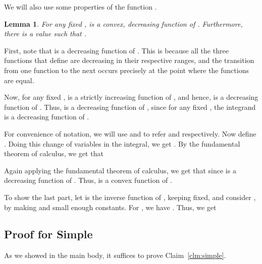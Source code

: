 \documentclass[11pt]{article}
\newtheorem{Lem}[theorem]{Lemma}
\newenvironment{myproof}{\noindent {\sc Proof:}}{}
\newcommand\Simple{{\sc Simple}\xspace}
\begin{document}
We will also use some properties of the function .

\begin{Lem} \label{lem:H-properties}
For any fixed ,  is a convex, decreasing function of
. Furthermore, there is a value  such that .
\end{Lem}
\begin{myproof}
First, note that  is a decreasing function of . This is
because all the three functions that define  are decreasing in their
respective ranges, and the transition from one function to the next occurs
precisely at the point where the functions are equal.

Now, for any fixed ,  is a strictly increasing
function of , and hence,  is a
decreasing function of . Thus,  is a decreasing function of , since
for any fixed , the integrand  is a
decreasing function of .

For convenience of notation, we will use  and  to refer  and  respectively. Now define .
Doing this change of variables in the integral, we get . By the fundamental
theorem of calculus, we get that

Again applying the fundamental theorem of calculus, we get that
 since  is a decreasing function of . Thus,  is a convex
function of .

To show the last part, let  is the inverse function of
, keeping  fixed, and consider , by
making  and  small enough constants. For , we
have . Thus, we get

\end{myproof}


\subsection{Proof for {\Simple}}

As we showed in the main body, it suffices to prove
Claim~\ref{clm:simple}.
\end{document}
